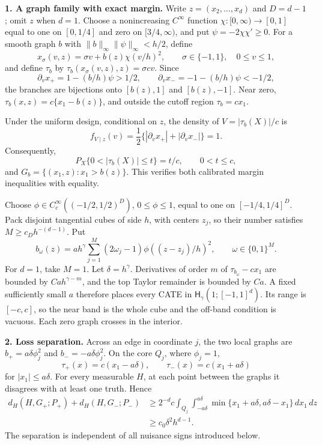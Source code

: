\textbf{1. A graph family with exact margin.} Write \(z=(x_2,\ldots,x_d)\) and \(D=d-1\); omit \(z\) when \(d=1\). Choose a nonincreasing \(C^\infty\) function \(\chi:[0,\infty)\to[0,1]\) equal to one on \([0,1/4]\) and zero on \([3/4,\infty)\), and put \(\psi=-2\chi\chi'\ge0\). For a smooth graph \(b\) with \(\|b\|_\infty\|\psi\|_\infty<h/2\), define
\[
x_\sigma(v,z)=\sigma v+b(z)\chi(v/h)^2,
\qquad \sigma\in\{-1,1\},\quad0\le v\le1,
\]
and define \(\tau_b\) by \(\tau_b(x_\sigma(v,z),z)=\sigma cv\). Since
\[
\partial_vx_+=1-(b/h)\psi>1/2,
\qquad
\partial_vx_-=-1-(b/h)\psi<-1/2,
\]
the branches are bijections onto \([b(z),1]\) and \([b(z),-1]\). Near zero, \(\tau_b(x,z)=c\{x_1-b(z)\}\), and outside the cutoff region \(\tau_b=cx_1\).

Under the uniform design, conditional on \(z\), the density of \(V=|\tau_b(X)|/c\) is
\[
 f_{V\mid z}(v)=\frac12\{|\partial_vx_+|+|\partial_vx_-|\}=1.
\]
Consequently,
\[
P_X\{0<|\tau_b(X)|\le t\}=t/c,
\qquad0<t\le c,
\]
and \(G_b=\{(x_1,z):x_1>b(z)\}\). This verifies both calibrated margin inequalities with equality.

Choose \(\phi\in C_c^\infty((-1/2,1/2)^D)\), \(0\le\phi\le1\), equal to one on \([-1/4,1/4]^D\). Pack disjoint tangential cubes of side \(h\), with centers \(z_j\), so their number satisfies \(M\ge c_Dh^{-(d-1)}\). Put
\[
b_\omega(z)=a h^\gamma\sum_{j=1}^M(2\omega_j-1)
 \phi((z-z_j)/h)^2,
\qquad \omega\in\{0,1\}^M.
\]
For \(d=1\), take \(M=1\). Let \(\delta=h^\gamma\). Derivatives of order \(m\) of \(\tau_{b_\omega}-cx_1\) are bounded by \(Cah^{\gamma-m}\), and the top Taylor remainder is bounded by \(Ca\). A fixed sufficiently small \(a\) therefore places every CATE in \(\mathsf H_\gamma(1;[-1,1]^d)\). Its range is \([-c,c]\), so the near band is the whole cube and the off-band condition is vacuous. Each zero graph crosses in the interior.

\textbf{2. Loss separation.} Across an edge in coordinate \(j\), the two local graphs are \(b_+=a\delta\phi_j^2\) and \(b_-=-a\delta\phi_j^2\). On the core \(Q_j\), where \(\phi_j=1\),
\[
\tau_+(x)=c(x_1-a\delta),
\qquad
\tau_-(x)=c(x_1+a\delta)
\]
for \(|x_1|\le a\delta\). For every measurable \(H\), at each point between the graphs it disagrees with at least one truth. Hence
\[
\begin{aligned}
d_H(H,G_+;P_+)+d_H(H,G_-;P_-)
&\ge2^{-d}c\int_{Q_j}\int_{-a\delta}^{a\delta}
 \min\{x_1+a\delta,a\delta-x_1\}\,dx_1\,dz\\
&\ge c_0\delta^2h^{d-1}.
\end{aligned}
\]
The separation is independent of all nuisance signs introduced below.

